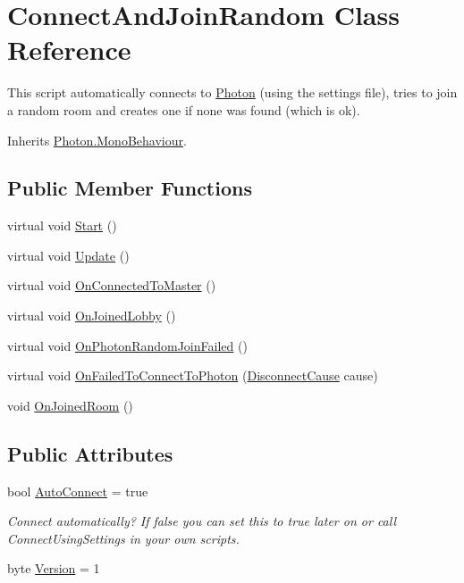 \hypertarget{class_connect_and_join_random}{}\section{Connect\+And\+Join\+Random Class Reference}
\label{class_connect_and_join_random}


This script automatically connects to \hyperlink{namespace_photon}{Photon} (using the settings file), tries to join a random room and creates one if none was found (which is ok).  




Inherits \hyperlink{class_photon_1_1_mono_behaviour}{Photon.\+Mono\+Behaviour}.

\subsection*{Public Member Functions}
\begin{DoxyCompactItemize}
\item 
virtual void \hyperlink{class_connect_and_join_random_a94e4c7f48112d0cdd76225301d58be0b}{Start} ()
\item 
virtual void \hyperlink{class_connect_and_join_random_ac667e7a1d80a18e1c03e39c74925a18f}{Update} ()
\item 
virtual void \hyperlink{class_connect_and_join_random_a2229303d2ad53f9ee29ee9cdd9a9f0be}{On\+Connected\+To\+Master} ()
\item 
virtual void \hyperlink{class_connect_and_join_random_a41b158cb3ba3aad65798e8013fc5c56e}{On\+Joined\+Lobby} ()
\item 
virtual void \hyperlink{class_connect_and_join_random_ab9a5bda7e2e657e4f78bd550010ed851}{On\+Photon\+Random\+Join\+Failed} ()
\item 
virtual void \hyperlink{class_connect_and_join_random_aadf3359d7ba471cae2073f11b609d615}{On\+Failed\+To\+Connect\+To\+Photon} (\hyperlink{group__public_api_gad61b1461cf60ad9e8d86923d111d5cc9}{Disconnect\+Cause} cause)
\item 
void \hyperlink{class_connect_and_join_random_a4774e18af3d44ea1592a965cd0c5cca6}{On\+Joined\+Room} ()
\end{DoxyCompactItemize}
\subsection*{Public Attributes}
\begin{DoxyCompactItemize}
\item 
bool \hyperlink{class_connect_and_join_random_ad1bdc6e43fba410f858cf53c003356a6}{Auto\+Connect} = true
\begin{DoxyCompactList}\small\item\em Connect automatically? If false you can set this to true later on or call Connect\+Using\+Settings in your own scripts.\end{DoxyCompactList}\item 
byte \hyperlink{class_connect_and_join_random_a3cfdc20e538daf4b47e15c90a8fd677b}{Version} = 1
\end{DoxyCompactItemize}
